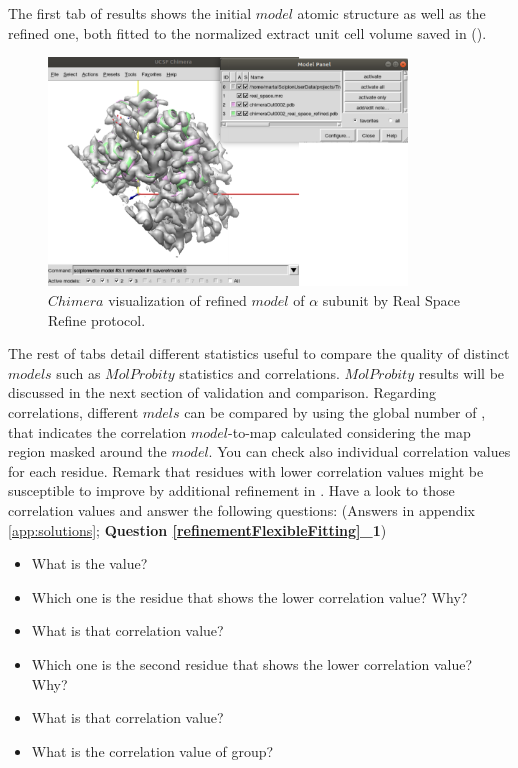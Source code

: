  The first tab of results shows the initial $model$ atomic structure as well as the refined one, both fitted to the normalized extract unit cell volume saved in \coot (). 
 
 \begin{figure}[H]
  \centering 
  \captionsetup{width=.7\linewidth} 
  \includegraphics[width=0.85\textwidth]{Images/Fig30}
  \caption{$Chimera$ visualization of refined $model$ of  $\alpha$ subunit by \phenix Real Space Refine protocol.}
  \label{fig:phenix_real_space_refine_chimera}
  \end{figure}
  
  The rest of tabs detail different statistics useful to compare the quality of distinct $models$ such as $MolProbity$ statistics and  correlations. $MolProbity$ results will be discussed in the next section of validation and comparison. Regarding  correlations, different $mdels$ can be compared by using the global number of \ccmask, that indicates the correlation $model$-to-map calculated considering the map region masked around the $model$. You can check also individual correlation values for each residue.  Remark that residues with lower correlation values might be susceptible to improve by additional refinement in \coot. Have a look to those correlation values and answer the following questions: (Answers in appendix \ref{app:solutions}; \textbf{Question \ref{refinementFlexibleFitting}\_1}) \\
  
  \begin{minipage}{\linewidth}
  \begin{framed}
  \begin{itemize}
  \item What is the \ccmask value?
  \item Which one is the residue that shows the lower correlation value? Why?
  \item What is that correlation value?
  \item Which one is the second residue that shows the lower correlation value? Why?
  \item What is that correlation value?
  \item What is the correlation value of  group?
  \end{itemize}
  \end{framed}
  \end{minipage}\\
  

